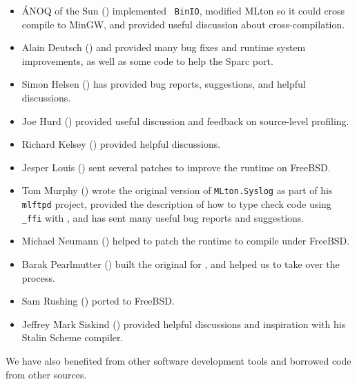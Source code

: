 \begin{itemize}

\item
\'{A}NOQ of the Sun () implemented {\tt
BinIO}, modified MLton so it could cross compile to MinGW, and provided useful
discussion about cross-compilation.

\item
Alain Deutsch () and  provided many bug fixes and
runtime system improvements, as well as some code to help the Sparc
port.

\item
Simon Helsen () has provided bug reports, suggestions,
and helpful discussions.

\item
Joe Hurd () provided useful discussion
and feedback on source-level profiling.

\item
Richard Kelsey () provided helpful
discussions.

\item
Jesper Louis () sent several patches to improve
the runtime on FreeBSD.

\item
Tom Murphy () wrote the original version
of {\tt MLton.Syslog} as part of his {\tt mlftpd} project, provided
the description of how to type check code using {\tt \_ffi} with
{\smlnj}, and has sent many useful bug reports and suggestions.

\item
Michael Neumann () helped to patch the runtime
to compile under FreeBSD.

\item
Barak Pearlmutter () built the original
for {\mlton}, and helped us to take over the process.

\item
Sam Rushing () ported {\mlton} to FreeBSD.

\item
Jeffrey Mark Siskind () provided helpful discussions
and inspiration with his Stalin Scheme compiler.

\end{itemize}
We have also benefited from other software development tools and borrowed code
from other sources.

